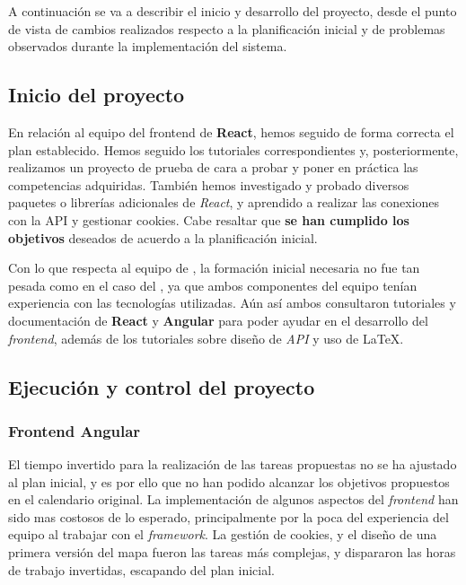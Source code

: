 \documentclass[11pt, a4paper, titlepage]{article}
\begin{document}
A continuación se va a describir el inicio y desarrollo del proyecto, desde el punto de vista de cambios realizados respecto a la planificación inicial y de problemas observados durante la implementación del sistema.

\subsection{Inicio del proyecto}
En relación al equipo del frontend de \textbf{React}, hemos seguido de forma correcta el plan establecido. Hemos seguido los tutoriales correspondientes y, posteriormente, realizamos un proyecto de prueba de cara a probar y poner en práctica las competencias adquiridas. También hemos investigado y probado diversos paquetes o librerías adicionales de \textit{React}, y aprendido a realizar las conexiones con la API y gestionar cookies. Cabe resaltar que \textbf{se han cumplido los objetivos} deseados de acuerdo a la planificación inicial.

Con lo que respecta al equipo de , la formación inicial necesaria no fue tan pesada como en el caso del , ya que ambos componentes del equipo tenían experiencia con las tecnologías utilizadas. Aún así ambos consultaron tutoriales y documentación de \textbf{React} y \textbf{Angular} para poder ayudar en el desarrollo del \textit{frontend}, además de los tutoriales sobre diseño de \textit{API} y uso de \LaTeX.

\subsection{Ejecución y control del proyecto}
\subsubsection{Frontend Angular}

El tiempo invertido para la realización de las tareas propuestas no se ha ajustado al plan inicial, y es por ello que no han podido alcanzar los objetivos propuestos en el calendario original. La implementación de algunos aspectos del \textit{frontend} han sido mas costosos de lo esperado, principalmente por la poca del experiencia del equipo al trabajar con el \textit{framework}. La gestión de cookies, y el diseño de una primera versión del mapa fueron las tareas más complejas, y dispararon las horas de trabajo invertidas, escapando del plan inicial.\\
\end{document}
